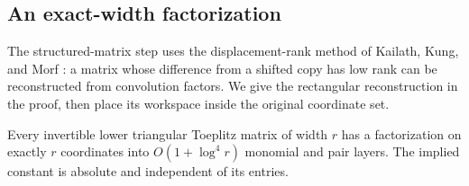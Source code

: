 \subsection{An exact-width factorization}

The structured-matrix step uses the displacement-rank method of Kailath,
Kung, and Morf \citep[Lemmas~1--2]{kailathKungMorf1979}: a matrix whose
difference from a shifted copy has low rank can be reconstructed from
convolution factors. We give the rectangular reconstruction in the proof,
then place its workspace inside the original coordinate set.

\begin{lemma}\label{fft:toeplitz-layers}
Every invertible lower triangular Toeplitz matrix of width $r$ has a
factorization on exactly $r$ coordinates into
$O(1+\log^4 r)$ monomial and pair layers.  The implied constant is
absolute and independent of its entries.
\end{lemma}

